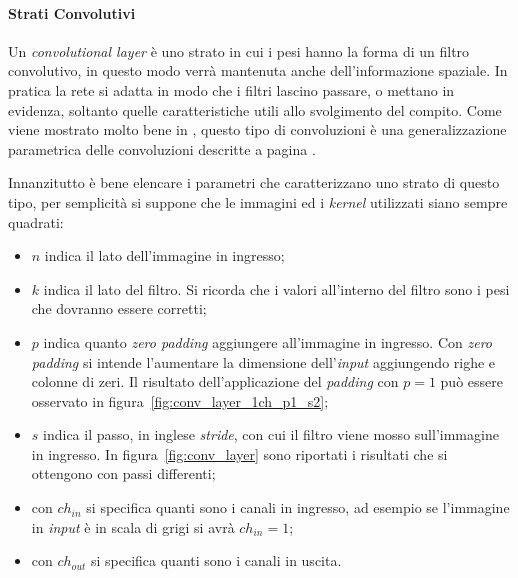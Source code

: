 \paragraph{Strati Convolutivi}
Un \textit{convolutional layer} è uno strato in cui i pesi hanno la forma di un filtro convolutivo, in questo modo verrà mantenuta anche dell'informazione spaziale.
In pratica la rete si adatta in modo che i filtri lascino passare, o mettano in evidenza, soltanto quelle caratteristiche utili allo svolgimento del compito.
Come viene mostrato molto bene in \cite{conv_arithm}, questo tipo di convoluzioni è una generalizzazione parametrica delle convoluzioni descritte a pagina \pageref{conv_para}.

Innanzitutto è bene elencare i parametri che caratterizzano uno strato di questo tipo, per semplicità si suppone che le immagini ed i \textit{kernel} utilizzati siano sempre quadrati:
\begin{itemize}
  \item $n$ indica il lato dell'immagine in ingresso;


  \item $k$ indica il lato del filtro.
    Si ricorda che i valori all'interno del filtro sono i pesi che dovranno essere corretti;

  \item $p$ indica quanto \textit{zero padding} aggiungere all'immagine in ingresso.
    Con \textit{zero padding} si intende l'aumentare la dimensione dell'\textit{input} aggiungendo righe e colonne di zeri.
    Il risultato dell'applicazione del \textit{padding} con $p=1$ può essere osservato in figura~\ref{fig:conv_layer_1ch_p1_s2};

  \item $s$ indica il passo, in inglese \textit{stride}, con cui il filtro viene mosso sull'immagine in ingresso.
    In figura~\ref{fig:conv_layer} sono riportati i risultati che si ottengono con passi differenti;

  \item con $ch_{in}$ si specifica quanti sono i canali in ingresso, ad esempio se l'immagine in \textit{input} è in scala di grigi si avrà $ch_{in} = 1$;

  \item con $ch_{out}$ si specifica quanti sono i canali in uscita.

\end{itemize}

